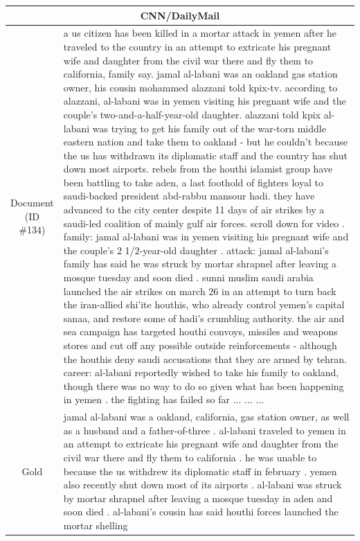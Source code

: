 \begin{table}[bth!]
\scriptsize
\centering
\renewcommand{\arraystretch}{1.3}
\begin{tabular}{c|p{}}
\hline
\multicolumn{2}{c}{CNN/DailyMail} \\ \hline
\makecell{Document\\(ID \#134)} & 
a us citizen has been killed in a mortar attack in yemen after he traveled to the country in an attempt to extricate his pregnant wife and daughter from the civil war there and fly them to california, family say. jamal al-labani was an oakland gas station owner, his cousin mohammed alazzani told kpix-tv. according to alazzani, al-labani was in yemen visiting his pregnant wife and the couple's two-and-a-half-year-old daughter. alazzani told kpix al-labani was trying to get his family out of the war-torn middle eastern nation and take them to oakland - but he couldn't because the us has withdrawn its diplomatic staff and the country has shut down most airports. rebels from the houthi islamist group have been battling to take aden, a last foothold of fighters loyal to saudi-backed president abd-rabbu mansour hadi. they have advanced to the city center despite 11 days of air strikes by a saudi-led coalition of mainly gulf air forces. scroll down for video . family: jamal al-labani was in yemen visiting his pregnant wife and the couple's 2 1/2-year-old daughter . attack: jamal al-labani's family has said he was struck by mortar shrapnel after leaving a mosque tuesday and soon died . sunni muslim saudi arabia launched the air strikes on march 26 in an attempt to turn back the iran-allied shi'ite houthis, who already control yemen's capital sanaa, and restore some of hadi's crumbling authority. the air and sea campaign has targeted houthi convoys, missiles and weapons stores and cut off any possible outside reinforcements - although the houthis deny saudi accusations that they are armed by tehran. career: al-labani reportedly wished to take his family to oakland, though there was no way to do so given what has been happening in yemen . the fighting has failed so far ... ... ... 
\\ \hline
Gold & 
jamal al-labani was a oakland, california, gas station owner, as well as a husband and a father-of-three . al-labani traveled to yemen in an attempt to extricate his pregnant wife and daughter from the civil war there and fly them to california . he was unable to because the us withdrew its diplomatic staff in february . yemen also recently shut down most of its airports . al-labani was struck by mortar shrapnel after leaving a mosque tuesday in aden and soon died . al-labani's cousin has said houthi forces launched the mortar shelling 

\end{tabular}
\end{table}
